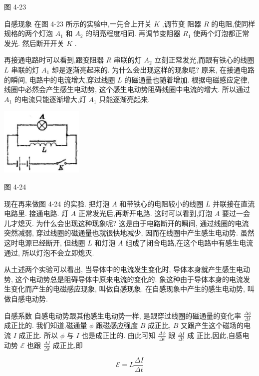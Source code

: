 \documentclass[10pt]{article}
\begin{document}
图 4-23

自感现象 在图 4-23 所示的实验中,一先合上开关 \(K\) ,调节变 阻器 \(R\) 的电阻,使同样规格的两个灯泡 \({A}_{1}\) 和 \({A}_{2}\) 的明亮程度相同. 再调节变阻器 \({R}_{1}\) 使两个灯泡都正常发光. 然后断开开关 \(K\) .

再接通电路时可以看到,跟变阻器 \(R\) 串联的灯 \({A}_{2}\) 立刻正常发光,而跟有铁心的线圈 \(L\) 串联的灯 \({A}_{1}\) 却是逐渐亮起来的. 为什么会出现这样的现象呢? 原来, 在接通电路的瞬间, 电路中的电流增大,穿过线圈 \(L\) 的磁通量也随着增加. 根据电磁感应定律, 线圈中必然会产生感生电动势, 这个感生电动势阻碍线圈中电流的增大. 所以通过 \({A}_{1}\) 的电流只能逐渐增大,灯 \({A}_{1}\) 只能逐渐亮起来.

\begin{center}
\includegraphics[max width=0.3\textwidth]{images/01913056-1f15-74d8-9184-9aab52c9d66b_149_403211.jpg}
\end{center}

图 4-24

现在再来做图 4-24 的实验. 把灯泡 \(A\) 和带铁心的电阻较小的线圈 \(L\) 并联接在直流电路里. 接通电路. 灯 \(A\) 正常发光后,再断开电路. 这时可以看到,灯泡 \(A\) 要过一会儿才熄灭. 为什么会出现这种现象呢? 这是由于电路断开的瞬间, 通过线圈的电流突然减弱, 穿过线圈的磁通量也就很快地减少, 因而在线圈中产生感生电动势. 虽然这时电源已经断开, 但线圈 \(L\) 和灯泡 \(A\) 组成了闭合电路,在这个电路中有感生电流通过, 所以灯泡不会立即熄灭.

从土述两个实验可以看出, 当导体中的电流发生变化时, 导体本身就产生感生电动势, 这个电动势总是阻碍导体中原来电流的变化的. 象这种由于导体本身的电流发生变化而产生的电磁感应现象, 叫做自感现象. 在自感现象中产生的感生电动势, 叫做自感电动势.

自感系数 自感电动势跟其他感生电动势一样, 是跟穿过线圈的磁通量的变化率 \(\frac{\Delta \phi }{\Delta t}\) 成正比的. 我们知道,磁通量 \(\phi\) 跟磁感应强度 \(B\) 成正比, \(B\) 又跟产生这个磁场的电流 \(I\) 成正比. 所以 \(\phi\) 与 \(I\) 也是成正比的. 由此可知 \(\frac{\Delta \phi }{\Delta t}\) 跟 \(\frac{\Delta I}{\Delta t}\) 成 正比,因此,自感电动势 \(\mathcal{E}\) 也跟 \(\frac{\Delta I}{\Delta t}\) 成正比,即

\[
\mathcal{E} = L\frac{\Delta I}{\Delta t}
\]
\end{document}
